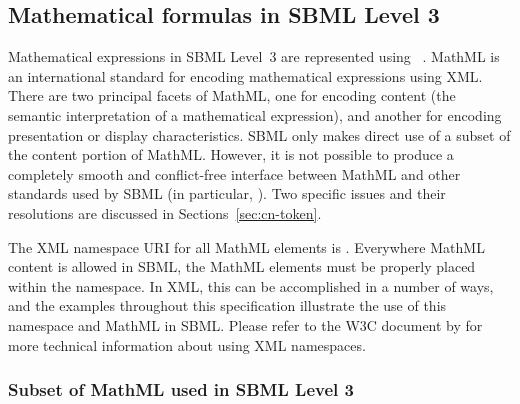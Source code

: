 \subsection{Mathematical formulas in SBML Level 3}
\label{sec:formulas}

Mathematical expressions in SBML Level~3 are represented using
\mathmltwo~\citep{w3c:2000b}.  MathML is an international standard
for encoding mathematical expressions using XML.  There are two
principal facets of MathML, one for encoding content (\ie the
semantic interpretation of a mathematical expression), and another
for encoding presentation or display characteristics.  SBML only
makes direct use of a subset of the content portion of MathML.
However, it is not possible to produce a completely smooth and
conflict-free interface between MathML and other standards used by
SBML (in particular, \xmlschema).  Two specific issues and their
resolutions are discussed in Sections~\ref{sec:cn-token}.

The XML namespace URI for all MathML elements is
.  Everywhere MathML
content is allowed in SBML, the MathML elements must be properly
placed within the \mathmltwo namespace.  In XML, this can be
accomplished in a number of ways, and the examples throughout this
specification illustrate the use of this namespace and MathML in
SBML.  Please refer to the W3C document by \citet{bray:1999} for
more technical information about using XML namespaces.


\subsubsection{Subset of MathML used in SBML Level 3}
\label{sec:mathmlsubset}


